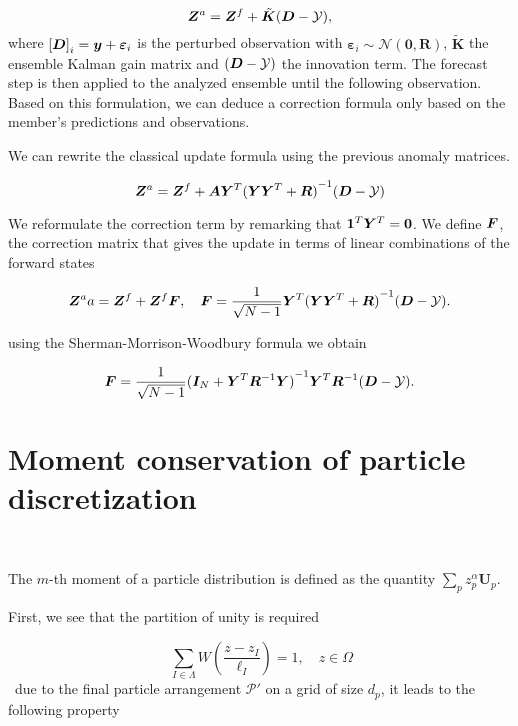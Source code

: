 \begin{equation} \label{enkf_formula}
    \bm{Z}^a = \bm{Z}^f + \tilde{\bm{K}} ( \bm{D} - \mathcal{Y}),
\end{equation}where ${[\bm{D}]}_i = \bm{y} + \bm{\varepsilon}_i$ is the perturbed observation with $\bm{\varepsilon}_i \sim \mathcal{N}(\bm{0}, \bm R) $, $\tilde{\bm{K}}$ the ensemble Kalman gain matrix and $( \bm{D} - \mathcal{Y})$ the innovation term.
The forecast step is then applied to the analyzed ensemble until the following observation.
Based on this formulation, we can deduce a correction formula only based on the member's predictions and observations.

We can rewrite the classical update formula using the previous anomaly matrices.

\begin{equation*}
    \bm{Z}^a = \bm{Z}^f + \bm A \bm Y^T {({\bm Y \bm Y^T + \bm R})}^{-1}(\bm{D} - \mathcal{Y})
\end{equation*}

We reformulate the correction term by remarking that $ \bm{1}^T  \bm Y^T = \bm{0}$. We define $\bm{F}$, the correction matrix that gives the update in terms of linear combinations of the forward states

\begin{equation*}
    \bm{Z}^aa = \bm{Z}^f + \bm{Z}^f \bm{F}, \quad \bm{F} = \frac{1}{\sqrt{N - 1}}\bm Y^T {(\bm Y \bm Y^T + \bm R)}^{-1}(\bm{D} - \mathcal{Y}).
\end{equation*}

using the Sherman-Morrison-Woodbury formula we obtain

\begin{equation*}
    \bm{F} = \frac{1}{\sqrt{N - 1}} {(\bm I_N + \bm Y^T\bm R^{-1}\bm Y)}^{-1}\bm Y^T \bm R^{-1} (\bm{D} - \mathcal{Y}).
\end{equation*}


\section{Moment conservation of particle discretization}~\label{appendix:moment_conservation}

The $m$-th moment of a particle distribution is defined as the quantity $\sum_{p} z_p^{\alpha} \bm{U}_p$.

First, we see that the partition of unity is required

\begin{equation}~\label{eq:unity1}
    \sum_{I \in \Lambda} W\left(\frac{z - z_I}{\ell_I}\right) = 1 ,\quad z \in \Omega
\end{equation}~due to the final particle arrangement $\mathcal{P'}$ on a grid of size $d_p$, it leads to the following property

